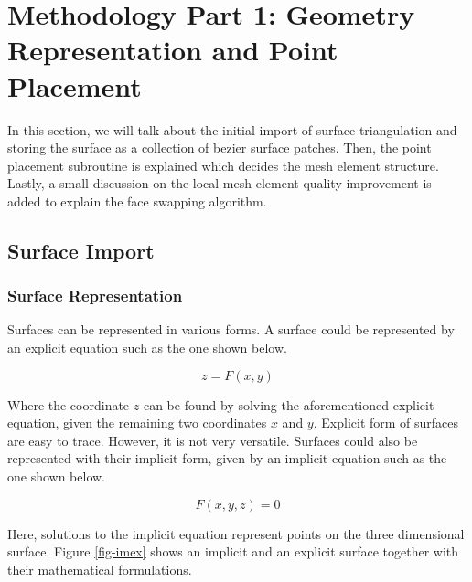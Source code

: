 \chapter{Methodology Part 1: Geometry Representation and Point Placement}

In this section, we will talk about the initial import of surface triangulation and storing the surface as a collection of bezier surface patches. Then, the point placement subroutine is explained which decides the mesh element structure. Lastly, a small discussion on the local mesh element quality improvement is added to explain the face swapping algorithm.

\section{Surface Import}

\subsection{Surface Representation}

Surfaces can be represented in various forms. A surface could be represented by an explicit equation such as the one shown below.

\begin{equation}
z = F(x,y)
\end{equation}

Where the coordinate $z$ can be found by solving the aforementioned explicit equation, given the remaining two coordinates $x$ and $y$.  Explicit form of surfaces are easy to trace. However, it is not very versatile. Surfaces could also be represented with their implicit form, given by an implicit equation such as the one shown below.

\begin{equation}
F(x, y, z) = 0
\end{equation}

Here, solutions to the implicit equation represent points on the three dimensional surface. Figure \ref{fig-imex} shows an implicit and an explicit surface together with their mathematical formulations.

